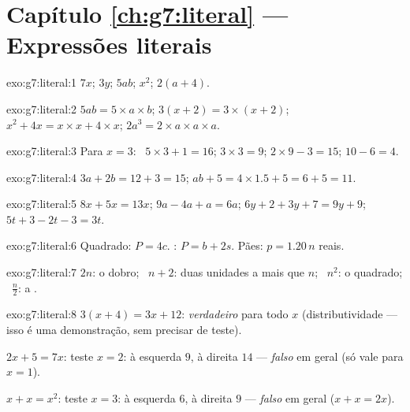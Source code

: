 \section*{Capítulo \ref{ch:g7:literal} --- Expressões literais}

\begin{solution}{exo:g7:literal:1}
$7x$; \quad $3y$; \quad $5ab$; \quad $x^2$; \quad $2(a + 4)$.
\end{solution}

\begin{solution}{exo:g7:literal:2}
$5ab = 5 \times a \times b$; \quad
$3(x+2) = 3 \times (x + 2)$; \quad
$x^2 + 4x = x \times x + 4 \times x$; \quad
$2a^3 = 2 \times a \times a \times a$.
\end{solution}

\begin{solution}{exo:g7:literal:3}
Para $x = 3$: \ $5 \times 3 + 1 = 16$; \quad $3 \times 3 = 9$; \quad
$2 \times 9 - 3 = 15$; \quad $10 - 6 = 4$.
\end{solution}

\begin{solution}{exo:g7:literal:4}
$3a + 2b = 12 + 3 = 15$; \qquad
$ab + 5 = 4 \times 1.5 + 5 = 6 + 5 = 11$.
\end{solution}

\begin{solution}{exo:g7:literal:5}
$8x + 5x = 13x$; \quad
$9a - 4a + a = 6a$; \quad
$6y + 2 + 3y + 7 = 9y + 9$; \quad
$5t + 3 - 2t - 3 = 3t$.
\end{solution}

\begin{solution}{exo:g7:literal:6}
Quadrado: $P = 4c$. : $P = b + 2s$. Pães:
$p = 1.20\,n$ reais.
\end{solution}

\begin{solution}{exo:g7:literal:7}
$2n$: o dobro; \ $n + 2$: duas unidades a mais que $n$; \ $n^2$: o
quadrado; \ $\frac n2$: a .
\end{solution}

\begin{solution}{exo:g7:literal:8}
$3(x+4) = 3x + 12$: \emph{verdadeiro} para todo $x$ (distributividade
--- isso é uma demonstração, sem precisar de teste).

$2x + 5 = 7x$: teste $x = 2$: à esquerda $9$, à direita $14$ ---
\emph{falso} em geral (só vale para $x = 1$).

$x + x = x^2$: teste $x = 3$: à esquerda $6$, à direita $9$ ---
\emph{falso} em geral ($x + x = 2x$).
\end{solution}

